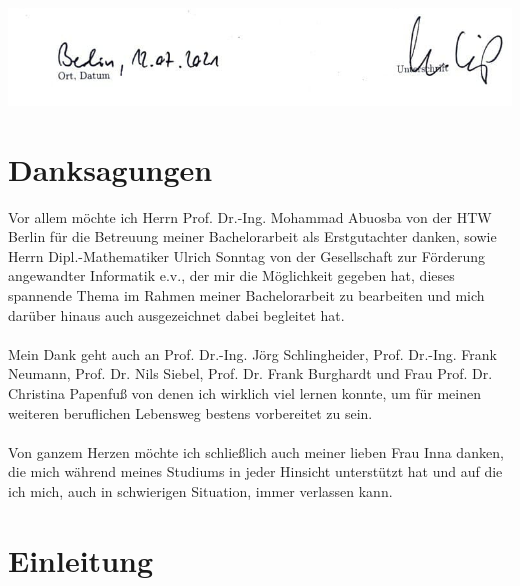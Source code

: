 \documentclass[
fontsize=10pt, 
listof = totoc,
parskip = half	
]{report}
\begin{document}
\vspace{4cm}

\includegraphics[width=\textwidth, height=\textheight, keepaspectratio]{pics/signature}

\newpage\null\thispagestyle{empty}\newpage

\chapter*{\centering Danksagungen}

Vor allem möchte ich Herrn Prof. Dr.-Ing. Mohammad Abuosba von der HTW Berlin für die Betreuung meiner Bachelorarbeit als Erstgutachter danken, sowie Herrn Dipl.-Mathematiker Ulrich Sonntag von der Gesellschaft zur Förderung angewandter Informatik e.v., der mir die Möglichkeit gegeben hat, dieses spannende Thema im Rahmen meiner Bachelorarbeit zu bearbeiten und mich darüber hinaus auch ausgezeichnet dabei begleitet hat. 
\\\\
\noindent Mein Dank geht auch an Prof. Dr.-Ing. Jörg Schlingheider, Prof. Dr.-Ing. Frank Neumann, Prof. Dr. Nils Siebel, Prof. Dr. Frank Burghardt und Frau Prof. Dr. Christina Papenfuß von denen ich wirklich viel lernen konnte, um für meinen weiteren beruflichen Lebensweg bestens vorbereitet zu sein.
\\\\
\noindent Von ganzem Herzen möchte ich schließlich auch meiner lieben Frau Inna danken, die mich während meines Studiums in jeder Hinsicht unterstützt hat und auf die ich mich, auch in schwierigen Situation, immer verlassen kann.

\newpage\null\thispagestyle{empty} 

\newpage
\tableofcontents
\newpage
{}
\listoffigures
{}
\newpage
\listoftables
{}
\newpage
{}
\newpage

\chapter{Einleitung}
\label{ch:Einleitung}
\end{document}

